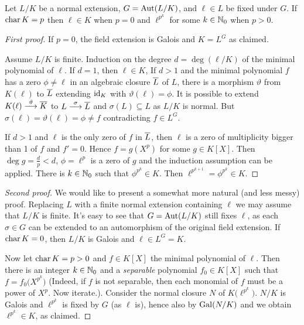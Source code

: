 \documentclass[a4paper,parskip=half,numbers=enddot, DIV=12]{scrreprt}
\begin{document}
	\begin{lem}
		Let $L/K$ be a normal extension, $G=\operatorname{Aut}(L/K)$, and $\ell\in L$ be fixed under $G$. If $\operatorname{char} K = p$ then $\ell\in K$ when $p=0$ and $\ell^{p^k}$ for some $k\in\mathbb{N}_0$ when $p>0$.
	\end{lem}
	\begin{proof}[First proof]
		If $p=0$, the field extension is Galois and $K=L^G$ as claimed. 
		
		Assume $L/K$ is finite. Induction on the degree $d=\deg(\ell/K)$ of the minimal polynomial of $\ell$. If $d=1$, then $\ell\in K$, If $d>1$ and the minimal polynomial $f$ has a zero $\phi\neq \ell$ in an algebraic closure $\overline L$ of $L$, there is a morphism $\vartheta$ from $K(\ell)$ to $\overline L$ extending $\operatorname{id}_K$ with $\vartheta(\ell) =\phi$. It is possible to extend $K(\ell)\morphism[\vartheta] \ov K$ to $L\morphism[\sigma] \ov L$ and $\sigma(L) \subseteq L$ as $L/K$ is normal. But $\sigma(\ell) = \vartheta(\ell) = \phi\neq f$ contradicting $f\in L^G$.
		
		If $d>1$ and $\ell$ is the only zero of $f$ in $\overline L$, then $\ell$ is a zero of multiplicity bigger than 1 of $f$ and $f'=0$. Hence $f=g(X^p)$ for some $g\in K[X]$. Then $\deg g = \frac{d}{p}<d$, $\phi =\ell^p$ is a zero of $g$ and the induction assumption can be applied. There is $k\in\mathbb{N}_0$ such that $\phi^{p^k}\in K$. Then $\ell^{p^{k+1}} = \phi^{p^k} \in K$.
	\end{proof}
	\begin{proof}[Second proof]
		We would like to present a somewhat more natural (and less messy) proof. Replacing $L$ with a finite normal extension containing $\ell$ we may assume that $L/K$ is finite. It's easy to see that $G=\operatorname{Aut}(L/K)$ still fixes $\ell$, as each $\sigma\in G$ can be extended to an automorphism of the original field extension. If $\operatorname{char} K=0$, then $L/K$ is Galois and $\ell\in L^G=K$.
		
		Now let $\operatorname{char} K=p>0$ and $f\in K[X]$ the minimal polynomial of $\ell$. Then there is an integer $k\in\mathbb{N}_0$ and a \emph{separable} polynomial $f_0\in K[X]$ such that $f=f_0\big(X^{p^k}\big)$ (Indeed, if $f$ is not separable, then each monomial of $f$ must be a power of $X^p$. Now iterate.). Consider the normal closure $N$ of $K\big(\ell^{p^k}\big)$. $N/K$ is Galois and $\ell^{p^k}$ is fixed by $G$ (as $\ell$ is), hence also by $\operatorname{Gal}(N/K)$ and we obtain $\ell^{p^k}\in K$, as claimed.
	\end{proof}
\end{document}
